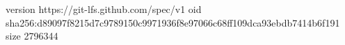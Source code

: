 version https://git-lfs.github.com/spec/v1
oid sha256:d89097f8215d7c9789150c9971936f8e97066c68ff109dca93ebdb7414b6f191
size 2796344
